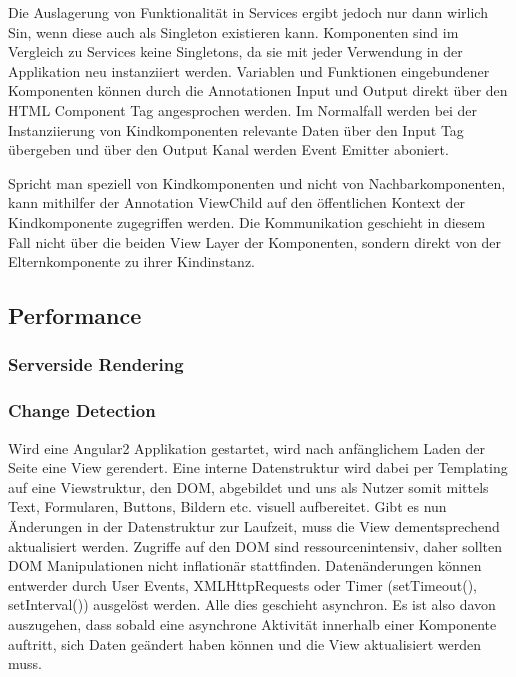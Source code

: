 Die Auslagerung von Funktionalität in Services ergibt jedoch nur dann wirlich Sin,
wenn diese auch als Singleton existieren kann. Komponenten sind im Vergleich zu Services keine Singletons,
da sie mit jeder Verwendung in der Applikation neu instanziiert werden.
Variablen und Funktionen eingebundener Komponenten können durch die Annotationen Input und Output
direkt über den HTML Component Tag angesprochen werden. Im Normalfall werden bei der Instanziierung von Kindkomponenten
relevante Daten über den Input Tag übergeben und über den Output Kanal werden Event Emitter aboniert. \cite{Angul94:online}

Spricht man speziell von Kindkomponenten und nicht von Nachbarkomponenten,
kann mithilfer der Annotation ViewChild auf den öffentlichen Kontext der Kindkomponente zugegriffen werden.
Die Kommunikation geschieht in diesem Fall nicht über die beiden View Layer der Komponenten,
sondern direkt von der Elternkomponente zu ihrer Kindinstanz. \cite{ViewC61:online}

\subsection{Performance}

\subsubsection{Serverside Rendering}

\subsubsection{Change Detection}

Wird eine Angular2 Applikation gestartet, wird nach anfänglichem Laden der Seite eine View gerendert.
Eine interne Datenstruktur wird dabei per Templating auf eine Viewstruktur, den DOM, abgebildet und uns als Nutzer somit mittels Text,
Formularen, Buttons, Bildern etc. visuell aufbereitet.
Gibt es nun Änderungen in der Datenstruktur zur Laufzeit, muss die View dementsprechend aktualisiert werden.
Zugriffe auf den DOM sind ressourcenintensiv, daher sollten DOM Manipulationen nicht inflationär stattfinden.
Datenänderungen können entwerder durch User Events, XMLHttpRequests oder Timer (setTimeout(), setInterval()) ausgelöst werden.
Alle dies geschieht asynchron. Es ist also davon auszugehen, dass sobald eine asynchrone Aktivität innerhalb einer Komponente auftritt,
sich Daten geändert haben können und die View aktualisiert werden muss.
\cite{changedetection-explained}

